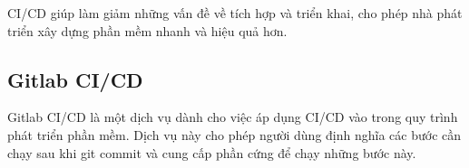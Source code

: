 \documentclass[./../main.tex]{subfiles}
\begin{document}
CI/CD giúp làm giảm những vấn đề về tích hợp và triển khai, cho phép nhà
phát triển xây dựng phần mềm nhanh và hiệu quả hơn.

\hypertarget{gitlab-cicd}{%
\subsection{Gitlab CI/CD}\label{gitlab-cicd}}

Gitlab CI/CD \cite{Git22} là một dịch vụ dành cho việc áp dụng CI/CD vào trong quy
trình phát triển phần mềm. Dịch vụ này cho phép người dùng định nghĩa
các bước cần chạy sau khi git commit và cung cấp phần cứng để chạy những
bước này.
\end{document}
